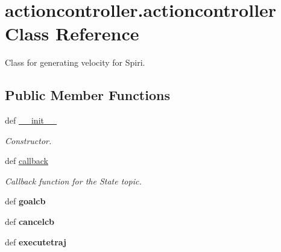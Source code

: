\hypertarget{classactioncontroller_1_1actioncontroller}{\section{actioncontroller.\-actioncontroller \-Class \-Reference}
\label{classactioncontroller_1_1actioncontroller}
}


\-Class for generating velocity for \-Spiri.  


\subsection*{\-Public \-Member \-Functions}
\begin{DoxyCompactItemize}
\item 
\hypertarget{classactioncontroller_1_1actioncontroller_af3130950d92a7c136f91101b88826f38}{def \hyperlink{classactioncontroller_1_1actioncontroller_af3130950d92a7c136f91101b88826f38}{\-\_\-\-\_\-init\-\_\-\-\_\-}}\label{classactioncontroller_1_1actioncontroller_af3130950d92a7c136f91101b88826f38}

\begin{DoxyCompactList}\small\item\em \-Constructor. \end{DoxyCompactList}\item 
def \hyperlink{classactioncontroller_1_1actioncontroller_afeae7368d7e407b86a51e2a05d78978d}{callback}
\begin{DoxyCompactList}\small\item\em \-Callback function for the \-State topic. \end{DoxyCompactList}\item 
\hypertarget{classactioncontroller_1_1actioncontroller_a8d6f43f07c03d1f472001bb9f1816da5}{def {\bfseries goalcb}}\label{classactioncontroller_1_1actioncontroller_a8d6f43f07c03d1f472001bb9f1816da5}

\item 
\hypertarget{classactioncontroller_1_1actioncontroller_a2ec9338f745e4b2180506d1276da4207}{def {\bfseries cancelcb}}\label{classactioncontroller_1_1actioncontroller_a2ec9338f745e4b2180506d1276da4207}

\item 
\hypertarget{classactioncontroller_1_1actioncontroller_a98ac5c4d2c30bf30c2b93d2c8b0768db}{def {\bfseries executetraj}}\label{classactioncontroller_1_1actioncontroller_a98ac5c4d2c30bf30c2b93d2c8b0768db}


\end{DoxyCompactItemize}
